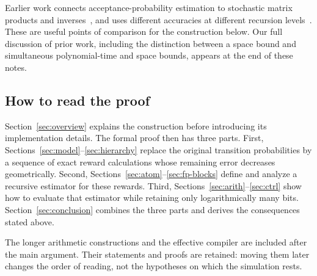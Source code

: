 Earlier work connects acceptance-probability estimation to stochastic matrix products and inverses~\cite{AhmadinejadKelnerMurtaghPeeblesSidfordVadhan2020}, and uses different accuracies at different recursion levels~\cite{CohenDoronSberloTaShma2023}. These are useful points of comparison for the construction below. Our full discussion of prior work, including the distinction between a space bound and simultaneous polynomial-time and space bounds, appears at the end of these notes.

\subsection{How to read the proof}

Section~\ref{sec:overview} explains the construction before introducing its implementation details. The formal proof then has three parts. First, Sections~\ref{sec:model}--\ref{sec:hierarchy} replace the original transition probabilities by a sequence of exact reward calculations whose remaining error decreases geometrically. Second, Sections~\ref{sec:atom}--\ref{sec:fp-blocks} define and analyze a recursive estimator for these rewards. Third, Sections~\ref{sec:arith}--\ref{sec:ctrl} show how to evaluate that estimator while retaining only logarithmically many bits. Section~\ref{sec:conclusion} combines the three parts and derives the consequences stated above.

The longer arithmetic constructions and the effective compiler are included after the main argument. Their statements and proofs are retained: moving them later changes the order of reading, not the hypotheses on which the simulation rests.
